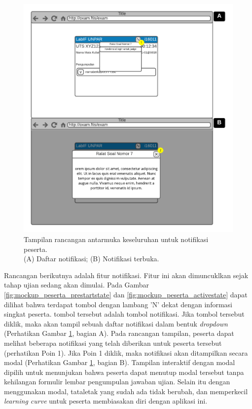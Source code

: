     \begin{figure}
        \centering
        \includegraphics[width=0.7\paperwidth]{Gambar/mockups/Mockup--Peserta - Notif.pdf}
        \caption{Tampilan rancangan antarmuka keseluruhan untuk notifikasi peserta. \\
            (A) Daftar notifikasi; (B) Notifikasi terbuka.}
        \label{fig:mockup_peserta_notif}
    \end{figure}
    Rancangan berikutnya adalah fitur notifikasi. Fitur ini akan dimuncuklkan sejak tahap ujian sedang akan
    dimulai. Pada Gambar \ref{fig:mockup_peserta_prestartstate} dan \ref{fig:mockup_peserta_activestate}
    dapat dilihat bahwa terdapat tombol dengan lambang 'N' dekat dengan informasi singkat peserta.
    tombol tersebut adalah tombol notifikasi. Jika tombol tersebut diklik, maka akan tampil sebuah
    daftar notifikasi dalam bentuk \textit{dropdown} (Perhatikan Gambar \ref{fig:mockup_peserta_notif},
    bagian A). Pada rancangan tampilan, peserta dapat melihat beberapa notifikasi yang telah
    diberikan untuk peserta tersebut (perhatikan Poin 1). Jika Poin 1 diklik, maka notifikasi akan
    ditampilkan secara modal (Perhatikan Gambar \ref{fig:mockup_peserta_notif}, bagian B).
    Tampilan interaktif dengan modal dipilih untuk menunjukan bahwa peserta dapat menutup
    modal tersebut tanpa kehilangan formulir lembar pengumpulan jawaban ujian.
    Selain itu dengan menggunakan modal, tataletak yang sudah ada tidak berubah, dan memperkecil
    \textit{learning curve} untuk peserta membiasakan diri dengan aplikasi ini.
    
